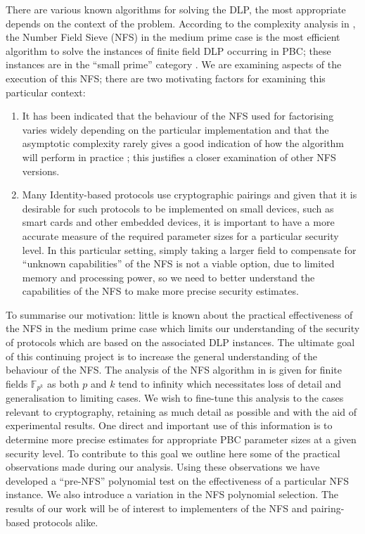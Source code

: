\documentclass[a4paper, 10pt, envcountsect, runningheads]{lms}
\newcommand{\F}{{\mathbb F}}
\numberwithin{figure}{section}
\numberwithin{equation}{section}
\begin{document}
There are various known algorithms for solving the DLP, the most appropriate depends on the context of the problem. According to the complexity analysis in \cite{joux-lercier-smart-vercauteren06}, the Number Field Sieve (NFS) in the medium prime case is the most efficient algorithm to solve the instances of finite field DLP occurring in PBC; these instances are in the ``small prime'' category \cite[Section 3.1]{joux-lercier-smart-vercauteren06}. We are examining aspects of the execution of this NFS; there are two motivating factors for examining this particular context: 
\begin{enumerate}
\item It has been indicated that the behaviour of the NFS used for factorising varies widely depending on the particular implementation and that the asymptotic complexity rarely gives a good indication of how the algorithm will perform in practice \cite{zajac,dan_predicting_nfs}; this justifies a closer examination of other NFS versions.
\item Many Identity-based protocols use cryptographic pairings and given that it is desirable for such protocols to be implemented on small devices, such as smart cards and other embedded devices, it is important to have a more accurate measure of the required parameter sizes for a particular security level. In this particular setting, simply taking a larger field to compensate for ``unknown capabilities'' of the NFS is not a viable option, due to limited memory and processing power, so we need to better understand the capabilities of the NFS to make more precise security estimates.
\end{enumerate}
To summarise our motivation: little is known about the practical effectiveness of the NFS in the medium prime case which limits our understanding of the security of protocols which are based on the associated DLP instances. 
The ultimate goal of this continuing project is to increase the general understanding of the behaviour of the NFS. The analysis of the NFS algorithm in \cite{joux-lercier-smart-vercauteren06} is given for finite fields $\F_{p^k}$ as both $p$ and $k$ tend to infinity which necessitates loss of detail and generalisation to limiting cases. We wish to fine-tune this analysis to the cases relevant to cryptography, retaining as much detail as possible and with the aid of experimental results. One direct and important use of this information is to determine more precise estimates for appropriate PBC parameter sizes at a given security level. To contribute to this goal we outline here some of the practical observations made during our analysis. Using these observations we have developed a ``pre-NFS'' polynomial test on the effectiveness of a particular NFS instance. We also introduce a variation in the NFS polynomial selection. The results of our work will be of interest to implementers of the NFS and pairing-based protocols alike. 
\end{document}
